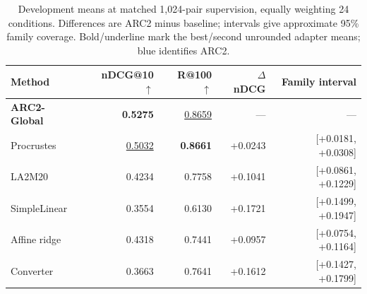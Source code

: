 \begin{table}[t]
\centering
\small
\setlength{\tabcolsep}{4pt}
\caption{Development means at matched 1,024-pair supervision, equally weighting 24 conditions. Differences are ARC2 minus baseline; intervals give approximate 95\% family coverage. Bold/underline mark the best/second unrounded adapter means; blue identifies ARC2.}\label{tab:dev}
\begin{tabular}{lrrrr}
\toprule
Method & nDCG@10 $\uparrow$ & R@100 $\uparrow$ & $\Delta$ nDCG & Family interval \\
\midrule
\rowcolor{arcPale}\textbf{ARC2-Global} & \textbf{0.5275} & \underline{0.8659} & --- & --- \\
Procrustes & \underline{0.5032} & \textbf{0.8661} & \textcolor{gainGreen}{+0.0243} & [+0.0181, +0.0308] \\
LA2M20 & 0.4234 & 0.7758 & \textcolor{gainGreen}{+0.1041} & [+0.0861, +0.1229] \\
SimpleLinear & 0.3554 & 0.6130 & \textcolor{gainGreen}{+0.1721} & [+0.1499, +0.1947] \\
Affine ridge & 0.4318 & 0.7441 & \textcolor{gainGreen}{+0.0957} & [+0.0754, +0.1164] \\
Converter & 0.3663 & 0.7641 & \textcolor{gainGreen}{+0.1612} & [+0.1427, +0.1799] \\
\bottomrule
\end{tabular}
\end{table}
